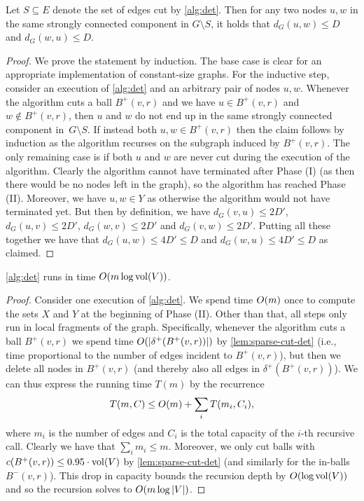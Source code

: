 \documentclass[letterpaper,11pt]{article}
\begin{document}
\begin{lemma} \label{lem:ldd-det-correctness}
Let $S \subseteq E$ denote the set of edges cut by \cref{alg:det}. Then for any two nodes $u, w$ in the same strongly connected component in $G \setminus S$, it holds that $d_G(u, w) \leq D$ and $d_G(w, u) \leq D$.
\end{lemma}
\begin{proof}
We prove the statement by induction. The base case is clear for an appropriate implementation of constant-size graphs. For the inductive step, consider an execution of \cref{alg:det} and an arbitrary pair of nodes $u, w$. Whenever the algorithm cuts a ball $B^+(v, r)$ and we have $u \in B^+(v, r)$ and $w \not\in B^+(v, r)$, then $u$ and $w$ do not end up in the same strongly connected component in~$G \setminus S$. If instead both $u, w \in B^+(v, r)$ then the claim follows by induction as the algorithm recurses on the subgraph induced by $B^+(v, r)$. The only remaining case is if both $u$ and $w$ are never cut during the execution of the algorithm. Clearly the algorithm cannot have terminated after Phase (I) (as then there would be no nodes left in the graph), so the algorithm has reached Phase (II). Moreover, we have $u, w \in Y$ as otherwise the algorithm would not have terminated yet. But then by definition, we have $d_G(v, u) \leq 2D'$, $d_G(u, v) \leq 2D'$, $d_G(w, v) \leq 2D'$ and $d_G(v, w) \leq 2D'$. Putting all these together we have that $d_G(u, w) \leq 4D' \leq D$ and $d_G(w, u) \leq 4D' \leq D$ as claimed.
\end{proof}

\begin{lemma} \label{lem:ldd-det-time}
\cref{alg:det} runs in time $O(m \log \operatorname{vol}(V))$.
\end{lemma}
\begin{proof}
Consider one execution of \cref{alg:det}. We spend time $O(m)$ once to compute the sets $X$ and $Y$ at the beginning of Phase (II). Other than that, all steps only run in local fragments of the graph. Specifically, whenever the algorithm cuts a ball $B^+(v, r)$ we spend time $O(|\delta^+(B^+(v, r))|)$ by \cref{lem:sparse-cut-det} (i.e., time proportional to the number of edges incident to $B^+(v, r)$), but then we delete all nodes in $B^+(v, r)$ (and thereby also all edges in $\delta^+(B^+(v, r))$). We can thus express the running time $T(m)$ by the recurrence
\begin{equation*}
	T(m, C) \leq O(m) + \sum_i T(m_i, C_i),
\end{equation*}
where $m_i$ is the number of edges and $C_i$ is the total capacity of the $i$-th recursive call. Clearly we have that $\sum_i m_i \leq m$. Moreover, we only cut balls with $c(B^+(v, r)) \leq 0.95 \cdot \operatorname{vol}(V)$ by \cref{lem:sparse-cut-det} (and similarly for the in-balls $B^-(v, r)$). This drop in capacity bounds the recursion depth by $O(\log \operatorname{vol}(V))$ and so the recursion solves to $O(m \log |V|)$.
\end{proof}
\end{document}
